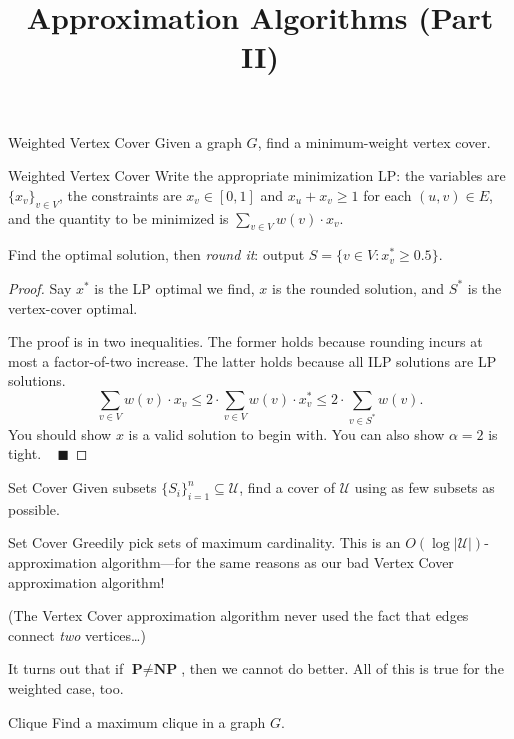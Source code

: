 \title{Approximation Algorithms (Part II)}



\begin{problem}{Weighted Vertex Cover}
    Given a graph $G$, find a minimum-weight vertex cover.
\end{problem}

\begin{solution}{Weighted Vertex Cover}
    Write the appropriate minimization LP: the variables are $\{x_v\}_{v \in V}$, the constraints are $x_v \in [0, 1]$ and $x_u + x_v \geq 1$ for each $(u, v) \in E$, and the quantity to be minimized is $\sum_{v \in V} w(v) \cdot x_v$.

    Find the optimal solution, then \emph{round it}: output $S = \{v \in V: x_v^* \geq 0.5\}$.
\end{solution}

\begin{proof}
    Say $x^*$ is the LP optimal we find, $x$ is the rounded solution, and $S^*$ is the vertex-cover optimal.

    The proof is in two inequalities.  The former holds because rounding incurs at most a factor-of-two increase.  The latter holds because all ILP solutions are LP solutions.
    \[ \sum_{v \in V} w(v) \cdot x_v \leq 2 \cdot \sum_{v \in V} w(v) \cdot x_v^* \leq 2 \cdot \sum_{v \in S^*} w(v). \]
    You should show $x$ is a valid solution to begin with.  You can also show $\alpha = 2$ is tight. ~ $\blacksquare$
\end{proof}

\begin{problem}{Set Cover}
    Given subsets $\{S_i\}_{i = 1}^n \subseteq \mathcal{U}$, find a cover of $\mathcal{U}$ using as few subsets as possible.
\end{problem}

\begin{solution}{Set Cover}
    Greedily pick sets of maximum cardinality.  This is an $O(\log |\mathcal{U}|)$-approximation algorithm---for the same reasons as our bad Vertex Cover approximation algorithm!

    (The Vertex Cover approximation algorithm never used the fact that edges connect \emph{two} vertices\dots)
\end{solution}

It turns out that if $\textbf{P} \neq \textbf{NP}$, then we cannot do better.  All of this is true for the weighted case, too.

\begin{problem}{Clique}
    Find a maximum clique in a graph $G$.
\end{problem}

